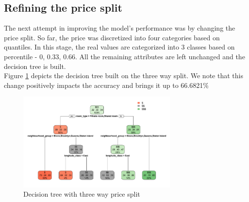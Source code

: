 \documentclass{sig-alternate}
\begin{document}
	\subsection{Refining the price split}
	The next attempt in improving the model's performance was by changing the price split. So far, the price was discretized into four categories based on quantiles. In this stage, the real values are categorized into 3 classes based on percentile - 0, 0.33, 0.66. All the remaining attributes are left unchanged and the decision tree is built.\\
	Figure \ref{decision4} depicts the decision tree built on the three way split. We note that this change positively impacts the accuracy and brings it up to 66.6821\%
	\begin{figure}[ht]
		\includegraphics[width=8cm]{decision4.PNG}
		\caption{Decision tree with three way price split}
		\label{decision4}
		\centering
	\end{figure}
\end{document}
